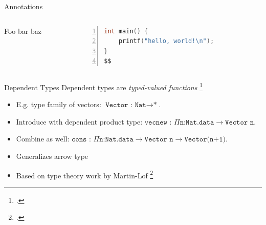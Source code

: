 \documentclass[aspectratio=169]{beamer}
\begin{document}

\begin{frame}[fragile]{Annotations}
  \footnotesize
  \begin{columns}[T]
    \begin{column}{0.45\textwidth}
        Foo bar baz
    \end{column}
    \begin{column}{0.45\textwidth}
%      
       \begin{lstlisting}[language=C,numbers=left,mathescape,basicstyle={\footnotesize\ttfamily}]
int main() {
    printf("hello, world!\n");
}
$$
        \end{lstlisting}
    \end{column}
  \end{columns}
\end{frame}

\begin{frame}{Dependent Types}
    Dependent types are \emph{typed-valued functions} \footcite{pierce_advanced_2005}
    \begin{itemize}
        \item E.g. type family of vectors: $\texttt{Vector : Nat}\rightarrow\texttt{*}$.
        \item Introduce with \alert{dependent product type}: $\texttt{vecnew : }\Pi\texttt{n:Nat.data}\rightarrow\texttt{Vector n}$.
        \item Combine as well: $\texttt{cons : }\Pi\texttt{n:Nat.data}\rightarrow\texttt{Vector n}\rightarrow\texttt{Vector(n+1)}$.
        \item Generalizes arrow type %
        \item Based on type theory work by Martin-Lof \footcite{martin-lof_constructive_1984}
    \end{itemize}
\end{frame}
\end{document}
